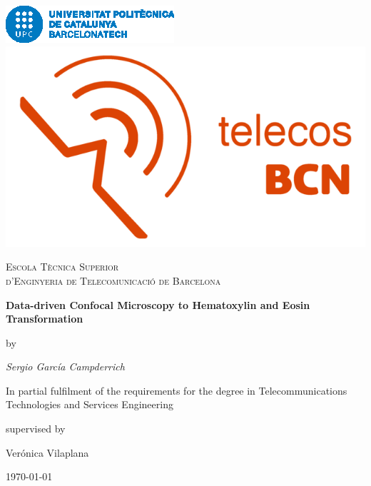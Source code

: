 \documentclass[a4paper,12pt,titlepage]{article}
\begin{document}
\begin{titlepage}
\centering

\includegraphics[height=0.07\textheight]{logo_barcelonatech}\hspace{0.5cm}
\includegraphics[height=0.07\textheight]{logo_telecos_2018}\par\vspace{1cm}

{\scshape\LARGE Escola Tècnica Superior \\ d'Enginyeria de Telecomunicació de Barcelona \par}\vspace{3mm}

{\huge\bfseries Data-driven Confocal Microscopy to Hematoxylin and Eosin Transformation\par}\vspace{2cm}

by\par
{\Large\itshape Sergio García Campderrich\par}
In partial fulfilment of the requirements for the degree in Telecommunications Technologies and Services Engineering\vfill

supervised by\par
Verónica Vilaplana

\vfill

{\large \today\par}
\end{titlepage}

\clearpage
\thispagestyle{empty}
\null\newpage

\end{document}
